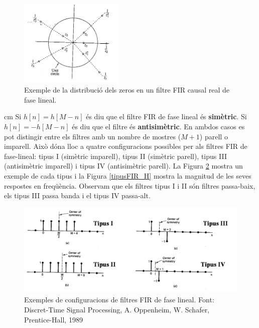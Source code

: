 \documentclass{article}
\begin{document}
\begin{figure}[htbp]
\begin{center}
\includegraphics[width=5cm]{zerosFIRlineal.png}
\end{center}
\caption{Exemple de la distribució dels zeros en un filtre FIR causal real de fase lineal.}
\label{zerosFIRlineal}
\end{figure}

 cm
Si $h[n]=h[M-n]$ és diu que el filtre FIR de fase lineal és \textbf{simètric}.
Si $h[n]=-h[M-n]$ és diu que el filtre és \textbf{antisimètric}. En ambdos casos es pot distingir
entre els filtres amb un nombre de mostres ($M+1$) parell o imparell. Això dóna lloc
a quatre configuracions possibles per als filtres FIR de fase-lineal:
tipus I (simètric imparell), tipus II (simètric parell), tipus III (antisimètric imparell)
i tipus IV (antisimètric parell). La Figura \ref{tipusFIR} mostra un exemple de cada tipus
i la Figura \ref{tipusFIR_H} mostra la magnitud de les seves respostes en freqüència.
Observam que els filtres tipus I i II són filtres passa-baix, els tipus III passa banda 
i el tipus IV passa-alt.

\begin{figure}[htbp]
\begin{center}
\includegraphics[width=12cm]{tipusFIR.png}
\end{center}
\caption{Exemples de configuracions de filtres FIR de fase lineal. Font: Discret-Time Signal
Processing, A. Oppenheim, W. Schafer, Prentice-Hall, 1989}
\label{tipusFIR}
\end{figure}
\end{document}
